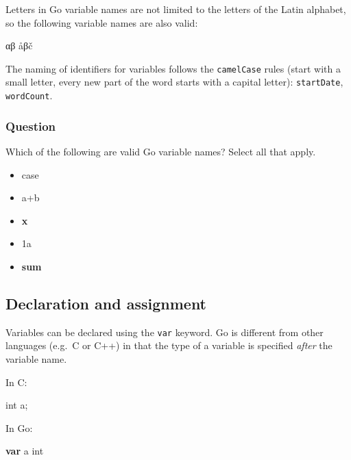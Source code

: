 \documentclass[]{book}
\newenvironment{Shaded}{\begin{snugshade}}{\end{snugshade}}
\newcommand{\DataTypeTok}[1]{\textcolor[rgb]{0.13,0.29,0.53}{#1}}
\newcommand{\KeywordTok}[1]{\textcolor[rgb]{0.13,0.29,0.53}{\textbf{#1}}}
\newcommand{\NormalTok}[1]{#1}
\providecommand{\tightlist}{%
  \setlength{\itemsep}{0pt}\setlength{\parskip}{0pt}}
\begin{document}
Letters in Go variable names are not limited to the letters of the Latin
alphabet, so the following variable names are also valid:

\begin{Shaded}
\begin{Highlighting}[]
\NormalTok{αβ}
\NormalTok{åβč}
\end{Highlighting}
\end{Shaded}

The naming of identifiers for variables follows the \texttt{camelCase} rules (start
with a small letter, every new part of the word starts with a capital letter):
\texttt{startDate}, \texttt{wordCount}.

\hypertarget{question-9}{%
\subsubsection*{Question}\label{question-9}}

Which of the following are valid Go variable names? Select all that apply.

\begin{itemize}
\tightlist
\item
  case
\item
  a+b
\item
  \textbf{x}
\item
  1a
\item
  \textbf{sum}
\end{itemize}

\hypertarget{declaration-and-assignment}{%
\subsection{Declaration and assignment}\label{declaration-and-assignment}}

Variables can be declared using the \texttt{var} keyword. Go is different from other
languages (e.g.~C or C++) in that the type of a variable is specified \emph{after}
the variable name.

In C:

\begin{Shaded}
\begin{Highlighting}[]
\DataTypeTok{int}\NormalTok{ a;}
\end{Highlighting}
\end{Shaded}

In Go:

\begin{Shaded}
\begin{Highlighting}[]
\KeywordTok{var}\NormalTok{ a }\DataTypeTok{int}
\end{Highlighting}
\end{Shaded}
\end{document}
